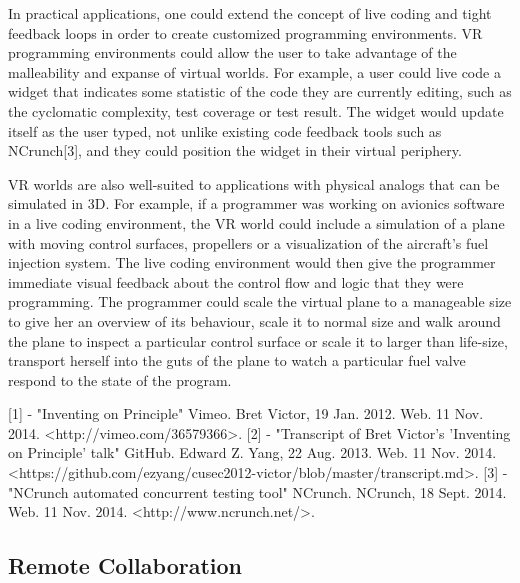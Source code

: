 \documentclass{acm_proc_article-sp}
\begin{document}
In practical applications, one could extend the concept of live coding and tight feedback loops in order to create customized programming environments. VR programming environments could allow the user to take advantage of the malleability and expanse of virtual worlds. For example, a user could live code a widget that indicates some statistic of the code they are currently editing, such as the cyclomatic complexity, test coverage or test result. The widget would update itself as the user typed, not unlike existing code feedback tools such as NCrunch[3], and they could position the widget in their virtual periphery.

VR worlds are also well-suited to applications with physical analogs that can be simulated in 3D. For example, if a programmer was working on avionics software in a live coding environment, the VR world could include a simulation of a plane with moving control surfaces, propellers or a visualization of the aircraft's fuel injection system. The live coding environment would then give the programmer immediate visual feedback about the control flow and logic that they were programming. The programmer could scale the virtual plane to a manageable size to give her an overview of its behaviour, scale it to normal size and walk around the plane to inspect a particular control surface or scale it to larger than life-size, transport herself into the guts of the plane to watch a particular fuel valve respond to the state of the program.

[1] - "Inventing on Principle" Vimeo. Bret Victor, 19 Jan. 2012. Web. 11 Nov. 2014. <http://vimeo.com/36579366>.
[2] - "Transcript of Bret Victor's 'Inventing on Principle' talk" GitHub. Edward Z. Yang, 22 Aug. 2013. Web. 11 Nov. 2014. <https://github.com/ezyang/cusec2012-victor/blob/master/transcript.md>.
[3] - "NCrunch automated concurrent testing tool" NCrunch. NCrunch, 18 Sept. 2014. Web. 11 Nov. 2014. <http://www.ncrunch.net/>.

\subsection{Remote Collaboration}

\end{document}
